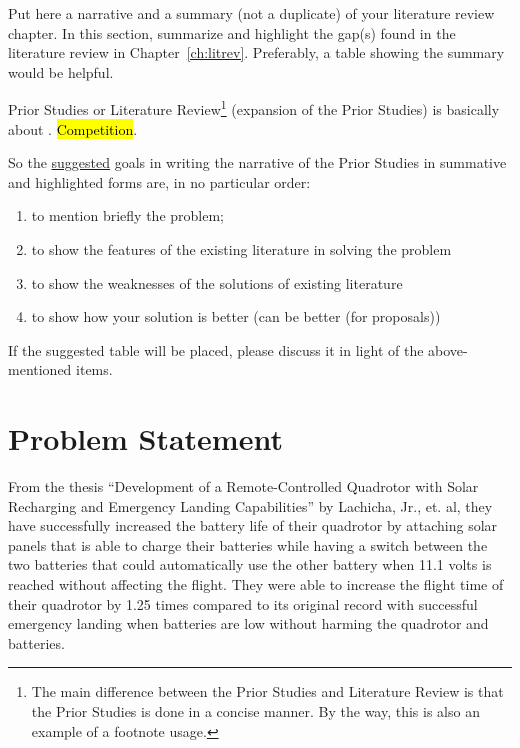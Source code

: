 Put here a narrative and a summary (not a duplicate) of your literature review chapter.  In this section, summarize and highlight the gap(s) found in the literature review in Chapter~\ref{ch:litrev}. Preferably, a table showing the summary would be helpful.

Prior Studies or Literature Review\footnote{The main difference between the Prior Studies and Literature Review is that the Prior Studies is done in a concise manner.  By the way, this is also an example of a footnote usage.} (expansion of the Prior Studies) is basically about . \hl{Competition}.

So the \underline{suggested} goals in writing the narrative of the Prior Studies in summative and highlighted forms  are, in no particular order:

\begin{enumerate}
	\item to mention briefly the problem;

	\item to show the features of the existing literature in solving the problem

	\item to show the weaknesses of the solutions of existing literature

	\item to show how your solution is better (can be better (for proposals))
\end{enumerate}

\noindent If the suggested table will be placed, please discuss it in light of the above-mentioned items.

 \graytx{\blindtext}


\section{Problem Statement}

From the thesis “Development of a Remote-Controlled Quadrotor with Solar Recharging and Emergency Landing Capabilities” by Lachicha, Jr., et. al, they have successfully increased the battery life of their quadrotor  by attaching solar panels that is able to charge their batteries while having a switch between the two batteries that could automatically use the other battery when 11.1 volts is reached without affecting the flight. They were able to increase the flight time of their quadrotor by 1.25 times compared to its original record with successful emergency landing when batteries are low without harming the quadrotor and batteries. 

